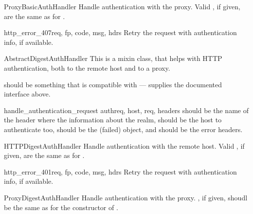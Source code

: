 \begin{classdesc}{ProxyBasicAuthHandler}{}
Handle authentication with the proxy.
Valid , if given, are the same as for
.
\end{classdesc}

\begin{methoddesc}[ProxyBasicAuthHandler]{http_error_407}{req, fp, code, 
                                                        msg, hdrs}
Retry the request with authentication info, if available.
\end{methoddesc}

\begin{classdesc}{AbstractDigestAuthHandler}{}
This is a mixin class, that helps with HTTP authentication, both
to the remote host and to a proxy.

 should be something that is compatible with
 --- supplies the documented interface above.
\end{classdesc}

\begin{methoddesc}[AbstractBasicAuthHandler]{handle_authentication_request}
                                            {authreq, host, req, headers}
 should be the name of the header where the information about
the realm,  should be the host to authenticate too,  
should be the (failed)  object, and  should be the 
error headers.
\end{methoddesc}

\begin{classdesc}{HTTPDigestAuthHandler}{}
Handle authentication with the remote host.
Valid , if given, are the same as for
.
\end{classdesc}

\begin{methoddesc}[HTTPDigestAuthHandler]{http_error_401}{req, fp, code, 
                                                        msg, hdrs}
Retry the request with authentication info, if available.
\end{methoddesc}

\begin{classdesc}{ProxyDigestAuthHandler}{}
Handle authentication with the proxy.
, if given, shoudl be the same as for 
the constructor of .
\end{classdesc}

